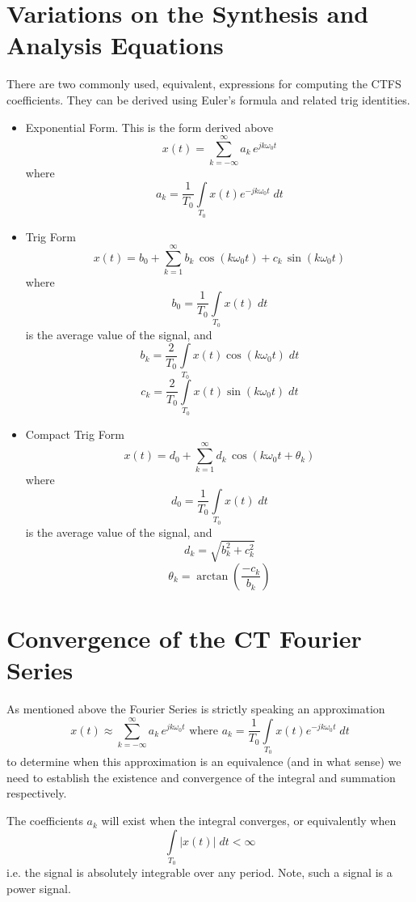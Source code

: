 \section{Variations on the Synthesis and Analysis Equations}
There are two commonly used, equivalent, expressions for computing the CTFS coefficients. They can be derived using Euler's formula and related trig identities.

\begin{itemize}
\item Exponential Form. This is the form derived above
  \[
  x(t) = \sum\limits_{k = -\infty}^{\infty} a_k \, e^{j k\omega_0 t}
  \]
  where 
  \[
  a_k = \frac{1}{T_0} \int\limits_{T_0} x(t)e^{-jk\omega_0 t} \; dt
  \]
\item Trig Form
  \[
  x(t) = b_0 + \sum\limits_{k = 1}^{\infty} b_k \,\cos(k\omega_0 t) + c_k\,\sin(k\omega_0 t) 
  \]
  where
  \[
  b_0 = \frac{1}{T_0} \int\limits_{T_0} x(t) \; dt
  \]
  is the average value of the signal, and
  \[
  b_k = \frac{2}{T_0} \int\limits_{T_0} x(t)\cos(k\omega_0 t) \; dt
  \]
  \[
  c_k = \frac{2}{T_0} \int\limits_{T_0} x(t)\sin(k\omega_0 t) \; dt
  \]
\item Compact Trig Form
  \[
  x(t) = d_0 + \sum\limits_{k = 1}^{\infty} d_k \,\cos(k\omega_0 t + \theta_k) 
  \]
  where
  \[
  d_0 = \frac{1}{T_0} \int\limits_{T_0} x(t) \; dt
  \]
  is the average value of the signal, and
  \[
  d_k = \sqrt{b_k^2 + c_k^2} 
  \]
  \[
  \theta_k = \arctan\left( \frac{-c_k}{b_k} \right)
  \]
\end{itemize}

\section{Convergence of the CT Fourier Series}

As mentioned above the Fourier Series is strictly speaking an approximation
\[
x(t) \approx \sum\limits_{k = -\infty}^{\infty} a_k \, e^{j k\omega_0 t} \mbox{ where } a_k = \frac{1}{T_0} \int\limits_{T_0} x(t)e^{-jk\omega_0 t} \; dt
\]
to determine when this approximation is an equivalence (and in what sense) we need to establish the existence and convergence of the integral and summation respectively.

The coefficients $a_k$ will exist when the integral converges, or equivalently when
\[
\int\limits_{T_0} \left|x(t)\right| \; dt < \infty
\]
i.e. the signal is absolutely integrable over any period. Note, such a signal is a power signal.

